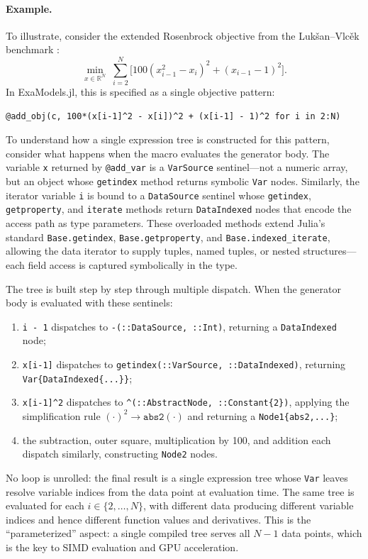\documentclass[11pt]{article}
\begin{document}
\paragraph{Example.}
To illustrate, consider the extended Rosenbrock objective from the Luk\v{s}an--Vlc\v{e}k benchmark \citep{lukVsanSparsePartiallySeparable}:
\begin{equation}\label{eq:rosenbrock}
  \min_{x \in \mathbb{R}^N}\; \sum_{i=2}^{N} \bigl[100(x_{i-1}^2 - x_i)^2 + (x_{i-1} - 1)^2\bigr].
\end{equation}
In ExaModels.jl, this is specified as a single objective pattern:
\begin{lstlisting}
@add_obj(c, 100*(x[i-1]^2 - x[i])^2 + (x[i-1] - 1)^2 for i in 2:N)
\end{lstlisting}
To understand how a single expression tree is constructed for this pattern, consider what happens when the macro evaluates the generator body. The variable \texttt{x} returned by \texttt{@add\_var} is a \texttt{VarSource} sentinel---not a numeric array, but an object whose \texttt{getindex} method returns symbolic \texttt{Var} nodes. Similarly, the iterator variable \texttt{i} is bound to a \texttt{DataSource} sentinel whose \texttt{getindex}, \texttt{getproperty}, and \texttt{iterate} methods return \texttt{DataIndexed} nodes that encode the access path as type parameters. These overloaded methods extend Julia's standard \texttt{Base.getindex}, \texttt{Base.getproperty}, and \texttt{Base.indexed\_iterate}, allowing the data iterator to supply tuples, named tuples, or nested structures---each field access is captured symbolically in the type.

The tree is built step by step through multiple dispatch. When the generator body is evaluated with these sentinels:
\begin{enumerate}
  \item \texttt{i - 1} dispatches to \texttt{-(::DataSource, ::Int)}, returning a \texttt{DataIndexed} node;
  \item \texttt{x[i-1]} dispatches to \texttt{getindex(::VarSource, ::DataIndexed)}, returning \texttt{Var\{DataIndexed\{...\}\}};
  \item \texttt{x[i-1]\^{}2} dispatches to \texttt{\^{}(::AbstractNode, ::Constant\{2\})}, applying the simplification rule $(\cdot)^2 \to \texttt{abs2}(\cdot)$ and returning a \texttt{Node1\{abs2,...\}};
  \item the subtraction, outer square, multiplication by 100, and addition each dispatch similarly, constructing \texttt{Node2} nodes.
\end{enumerate}
No loop is unrolled: the final result is a single expression tree whose \texttt{Var} leaves resolve variable indices from the data point at evaluation time. The same tree is evaluated for each $i \in \{2,\ldots,N\}$, with different data producing different variable indices and hence different function values and derivatives. This is the ``parameterized'' aspect: a single compiled tree serves all $N-1$ data points, which is the key to SIMD evaluation and GPU acceleration.
\end{document}

